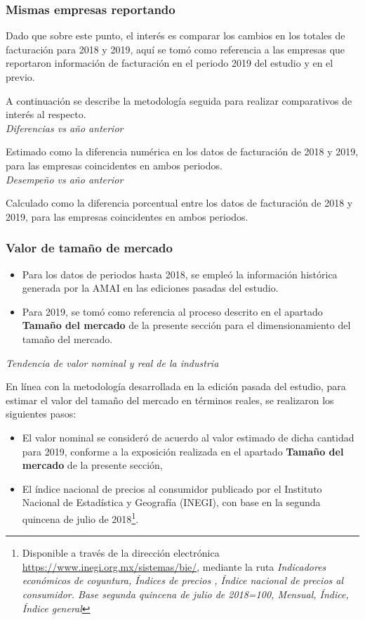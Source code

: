 \subsubsection{Mismas empresas reportando}

Dado que sobre este punto, el interés es comparar los cambios en los totales de facturación para 2018 y 2019, aquí se tomó como referencia a las empresas que reportaron información de facturación en el periodo 2019 del estudio y en el previo.

A continuación se describe la metodología seguida para realizar comparativos de interés al respecto.\\

\noindent \emph{Diferencias vs año anterior}

Estimado como la diferencia numérica en los datos de facturación de 2018 y 2019, para las empresas coincidentes en ambos periodos.\\

\noindent \emph{Desempeño vs año anterior}

Calculado como la diferencia porcentual entre los datos de facturación de 2018 y 2019, para las empresas coincidentes en ambos periodos.

\subsubsection{Valor de tamaño de mercado}

\begin{itemize}
\item Para los datos de periodos hasta 2018, se empleó la información histórica generada por la AMAI en las ediciones pasadas del estudio.

\item Para 2019, se tomó como referencia al proceso descrito en el apartado \textbf{Tamaño del mercado} de la presente sección para el dimensionamiento del tamaño del mercado.
\end{itemize}

\noindent \emph{Tendencia de valor nominal y real de la industria}

En línea con la metodología desarrollada en la edición pasada del estudio, para estimar el valor del tamaño del mercado en términos reales, se realizaron los siguientes pasos:

\begin{itemize}
    \item El valor nominal se consideró de acuerdo al valor estimado de dicha cantidad para 2019, conforme a la exposición realizada en el apartado \textbf{Tamaño del mercado} de la presente sección,
    \item El índice nacional de precios al consumidor publicado por el Instituto Nacional de Estadística y Geografía (INEGI), con base en la segunda quincena de julio de 2018\footnote{Disponible a través de la dirección electrónica \url{https://www.inegi.org.mx/sistemas/bie/}, mediante
la ruta \textit{Indicadores económicos de coyuntura, Índices de precios , Índice nacional de precios al consumidor. Base segunda quincena de julio de 2018=100, Mensual, Índice, Índice general}}.
\end{itemize}

